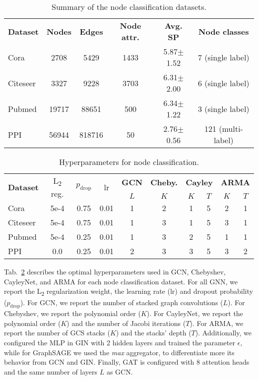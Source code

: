 \documentclass{article}
\begin{document}
\bgroup
\def\arraystretch{1.0} \setlength\tabcolsep{.2em} \begin{table}[!ht]
\small
\centering
\caption{Summary of the node classification datasets.} 
\label{tab:nc_dataset}
\begin{tabular}{lccccc}
\cmidrule[1.5pt]{1-6}
\textbf{Dataset} & \textbf{Nodes} & \textbf{Edges} & \textbf{Node attr.} & \textbf{Avg. SP} & \textbf{Node classes} \\
\cmidrule[.5pt]{1-6}
Cora     & 2708  & 5429   & 1433 & 5.87\tiny{$\pm$1.52} & 7   (single label) \\
Citeseer & 3327  & 9228   & 3703 & 6.31\tiny{$\pm$2.00} & 6   (single label) \\
Pubmed   & 19717 & 88651  & 500  & 6.34\tiny{$\pm$1.22} & 3   (single label) \\
PPI      & 56944 & 818716 & 50   & 2.76\tiny{$\pm$0.56} & 121 (multi-label)  \\
\cmidrule[1.5pt]{1-6}
\end{tabular}
\end{table}
\egroup



\begin{table}[!ht]
\setlength\tabcolsep{.25em} \small
\centering
\caption{Hyperparameters for node classification.}
\bgroup
\def\arraystretch{1.0} \begin{tabular}{lccc|c|c|cc|cc}
\cmidrule[1.5pt]{1-10}
\multirow{ 2}{*}{\textbf{Dataset}} & \multirow{ 2}{*}{L\textsubscript{2} reg.} & \multirow{ 2}{*}{$p_\text{drop}$} & \multirow{ 2}{*}{lr} & \textbf{GCN} & \textbf{Cheby.} & \multicolumn{2}{c|}{\textbf{Cayley}} & \multicolumn{2}{c}{\textbf{ARMA}} \\
& & & & $L$ & $K$ & $K$ & $T$ & $K$ & $T$ \\
\midrule
Cora     & 5e-4 & 0.75 & 0.01 & 1 & 2 & 1 & 5 & 2 & 1  \\
Citeseer & 5e-4 & 0.75 & 0.01 & 1 & 3 & 1 & 5 & 3 & 1  \\
Pubmed   & 5e-4 & 0.25 & 0.01 & 1 & 3 & 2 & 5 & 1 & 1  \\
PPI      & 0.0  & 0.25 & 0.01 & 2 & 3 & 3 & 5 & 3 & 2  \\
\cmidrule[1.5pt]{1-10}
\end{tabular}
\label{tab:hyper_nc}
\egroup
\end{table}


Tab.~\ref{tab:hyper_nc} describes the optimal hyperparameters used in GCN, Chebyshev, CayleyNet, and ARMA for each node classification dataset. 
For all GNN, we report the L\textsubscript{2} regularization weight, the learning rate (lr) and dropout probability ($p_\text{drop}$). For GCN, we report the number of stacked graph convolutions ($L$). For Chebyshev, we report the polynomial order ($K$). 
For CayleyNet, we report the polynomial order ($K$) and the number of Jacobi iterations ($T$).
For ARMA, we report the number of GCS stacks ($K$) and the stacks' depth ($T$).
Additionally, we configured the MLP in GIN with 2 hidden layers and trained the parameter $\epsilon$, while for GraphSAGE we used the \textit{max} aggregator, to differentiate more its behavior from GCN and GIN.
Finally, GAT is configured with 8 attention heads and the same number of layers $L$ as GCN.
\end{document}
